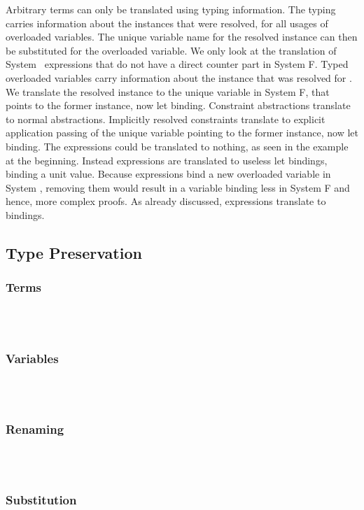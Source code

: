 \noindent Arbitrary terms can only be translated using typing information. The typing carries information about the instances that were resolved, for all usages of overloaded variables. The unique variable name for the resolved instance can then be substituted for the overloaded variable. We only look at the translation of System \Fo\ expressions that do not have a direct counter part in System F.
\DPTTerms
Typed overloaded variables  carry information about the instance that was resolved for .
We translate the resolved instance to the unique variable in System F, that points to the former instance, now let binding. 
Constraint abstractions translate to normal abstractions. 
Implicitly resolved constraints translate to explicit application passing of the unique variable pointing to the former instance, now let binding. The  expressions could be translated to nothing, as seen in the example at the beginning. Instead  expressions are translated to useless let bindings, binding a unit value.
Because  expressions bind a new overloaded variable in System \Fo, removing them would result in a variable binding less in System F and hence, more complex proofs.
As already discussed,  expressions translate to  bindings.

\subsection{Type Preservation}
\subsubsection{Terms}\hfill\\\\
\DPTTermPres
\subsubsection{Variables}\hfill\\\\
\DPTVarPresLookup
\DPTOVarPresLookup
\subsubsection{Renaming}\hfill\\\\
\DPTVarPresRen
\DPTTypePresRen
\DPTTypePresWk
\DPTTypePresWkInst
\subsubsection{Substitution}\hfill\\\\
\DPTVarPresSub
\DPTTypePresSub
\DPTTypePresSingleSub